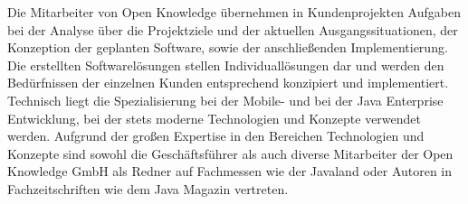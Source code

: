 Die Mitarbeiter von Open Knowledge übernehmen in Kundenprojekten Aufgaben bei der Analyse über die Projektziele und der aktuellen Ausgangssituationen, der Konzeption der geplanten Software, sowie der anschließenden Implementierung. Die erstellten Softwarelösungen stellen Individuallösungen dar und werden den Bedürfnissen der einzelnen Kunden entsprechend konzipiert und implementiert. Technisch liegt die Spezialisierung bei der Mobile- und bei der Java Enterprise Entwicklung, bei der stets moderne Technologien und Konzepte verwendet werden. Aufgrund der großen Expertise in den Bereichen Technologien und Konzepte sind sowohl die Geschäftsführer als auch diverse Mitarbeiter der Open Knowledge GmbH als Redner auf Fachmessen wie der Javaland oder Autoren in Fachzeitschriften wie dem Java Magazin vertreten.%

%

\pagebreak
